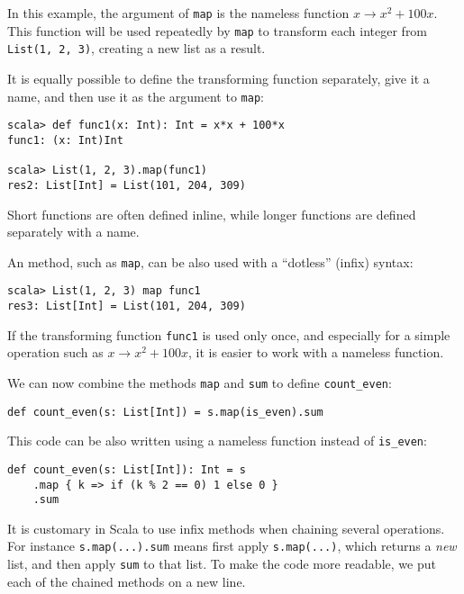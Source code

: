 In this example, the argument of \lstinline!map! is the nameless
function $x\rightarrow x^{2}+100x$. This function will be used repeatedly
by \texttt{}\lstinline!map! to transform each integer from \lstinline!List(1, 2, 3)!,
creating a new list as a result.

It is equally possible to define the transforming function separately,
give it a name, and then use it as the argument to \lstinline!map!:
\begin{lstlisting}
scala> def func1(x: Int): Int = x*x + 100*x
func1: (x: Int)Int 

scala> List(1, 2, 3).map(func1)
res2: List[Int] = List(101, 204, 309)
\end{lstlisting}
Short functions are often defined inline, while longer functions are
defined separately with a name.

An method, such as \lstinline!map!, can be also used with a \textsf{``}dotless\textsf{''}
(infix) syntax:
\begin{lstlisting}
scala> List(1, 2, 3) map func1
res3: List[Int] = List(101, 204, 309)
\end{lstlisting}

If the transforming function \lstinline!func1! is used only once,
and especially for a simple operation such as $x\rightarrow x^{2}+100x$,
it is easier to work with a nameless function.

We can now combine the methods \texttt{}\lstinline!map! and \texttt{}\lstinline!sum!
to define \lstinline!count_even!:

\begin{lstlisting}
def count_even(s: List[Int]) = s.map(is_even).sum
\end{lstlisting}

This code can be also written using a nameless function instead of
\lstinline!is_even!:

\begin{lstlisting}
def count_even(s: List[Int]): Int = s
    .map { k => if (k % 2 == 0) 1 else 0 }
    .sum
\end{lstlisting}

It is customary in Scala to use infix methods when chaining several
operations. For instance \lstinline!s.map(...).sum! means first apply
\lstinline!s.map(...)!, which returns a \emph{new} list, and then
apply \texttt{}\lstinline!sum! to that list. To make the code more
readable, we put each of the chained methods on a new line. 

